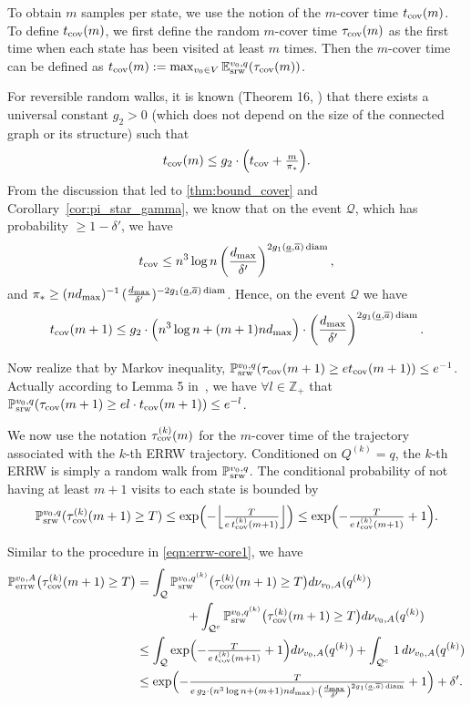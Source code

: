 \documentclass[a4paper, 11pt]{article}
\renewcommand{\P}{\mathbb{P}}
\newcommand{\E}{\mathbb{E}}
\newcommand{\Esrw}{\E_{\textnormal{srw}}}
\newcommand{\Psrw}{\P_{\textnormal{srw}}}
\newcommand{\Perrw}{\P_{\textnormal{errw}}}
\newcommand{\diam}{\textnormal{diam}}
\newcommand{\cov}{\textnormal{cov}}
\begin{document}
To obtain $m$ samples per state, we use the notion of the $m$-cover time 
$t_{\cov}(m)$. To define $t_{\cov}(m)$, we first define the random $m$-cover time $\tau_{\cov}(m)$ as the first time when each state has been visited at least $m$ times. Then the $m$-cover time can be defined as $t_{\cov}(m):=\max_{v_0\in V}\Esrw^{v_0,q}(\tau_{\cov}(m))$.

For reversible random walks, it is known (Theorem 16, \cite{cdl}) that there exists a universal constant $g_2>0$ (which does not depend on the size of the connected graph or its structure) such that
\[
  t_{\cov}(m) \leq g_2\cdot \Big(t_{\cov} + \tfrac{m}{\pi_*}\Big).
\]
From the discussion that led to \cref{thm:bound_cover} and Corollary~\ref{cor:pi_star_gamma}, we know that
on the event $\mathcal{Q}$, which has probability $\geq 1-\delta'$, we have
\[
t_\cov \leq n^3\log n \left( \frac{d_{\max}}{\delta'}\right)^{2g_1(\underline{a},\overline{a})\,\diam},
\]
and $\pi_* \ge (nd_{\max})^{-1}\,(\frac{d_{\max}}{\delta'})^{-2g_1(\underline{a},\overline{a})\,\diam}$. Hence, on the event $\mathcal{Q}$ we have
\[
  t_{\cov}(m+1) \le g_2\cdot \Big(n^3\log n + (m+1)nd_{\max}\Big)\cdot \left( \frac{d_{\max}}{\delta'}\right)^{2g_1(\underline{a},\overline{a})\,\diam}.
\]

Now realize that by Markov inequality, $\Psrw^{v_0,q}(\tau_\cov(m+1)\geq e t_\cov(m+1))\leq e^{-1}$. 
Actually according to Lemma 5 in~\cite{cdl}, we have $\forall l\in\mathbb{Z}_+$ that $\Psrw^{v_0,q}(\tau_\cov(m+1)\geq el \cdot t_\cov(m+1))\leq e^{-l}$. 

We now use the notation $\tau_\cov^{(k)}(m)$ for the $m$-cover time of the trajectory associated with the $k$-th ERRW trajectory. Conditioned on $Q^{(k)}=q$, the $k$-th ERRW is simply a random walk from $\Psrw^{v_0,q}$. The conditional probability of not having at least $m+1$ visits to each state is bounded by
\[
  \Psrw^{v_0,q}(\tau_\cov^{(k)}(m+1)\geq T)\leq \exp\Bigl(-\Big\lfloor\tfrac{T}{e\,t_\cov^{(k)}(m+1)}\Big\rfloor\Bigr)\leq \exp\Bigl(-\tfrac{T}{e\,t_\cov^{(k)}(m+1)}+1\Bigr).
\]

Similar to the procedure in \cref{eqn:errw-core1}, we have
\begin{align}
\label{eqn:errw-core2}
  \Perrw^{v_0,A}\bigl(\tau_\cov^{(k)}(m+1)\geq T\bigr)
  &= \int_{\mathcal{Q}}\Psrw^{v_0,q^{(k)}}\bigl(\tau_\cov^{(k)}(m+1)\geq T\bigr) d\nu_{v_0,A}(q^{(k)}) \nonumber \\
  & \hspace{4em} + \int_{\mathcal{Q}^c}\Psrw^{v_0,q^{(k)}}\bigl(\tau_\cov^{(k)}(m+1)\geq T\bigr) d\nu_{v_0,A}(q^{(k)})\nonumber \\
  &\le \int_{\mathcal{Q}} \exp\Bigl(-\tfrac{T}{e\,t_\cov^{(k)}(m+1)}+1\Bigr) d\nu_{v_0,A}(q^{(k)}) + \int_{\mathcal{Q}^c} \,1\, d\nu_{v_0,A}(q^{(k)})\nonumber \\
  & \le \exp\Bigl(-\tfrac{T}{e\,g_2\cdot(n^3\log n + (m+1)nd_{\max})\cdot \left( \frac{d_{\max}}{\delta'}\right)^{2g_1(\underline{a},\overline{a})\,\diam}}+1\Bigr) + \delta'.
\end{align}
\end{document}
